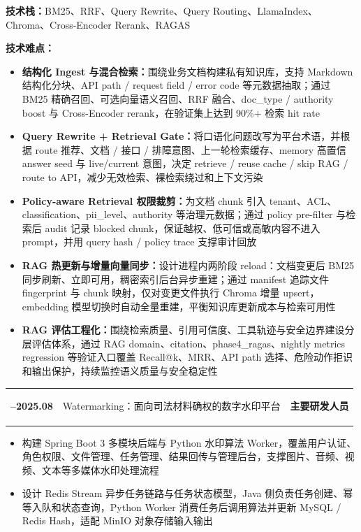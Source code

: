\documentclass[9pt,a4paper]{ctexart}
\makeatletter
\newcommand{\ResumeBodySize}{\fontsize{8.35pt}{9.20pt}\selectfont}
\newcommand{\ResumeSmallSize}{\fontsize{7.95pt}{8.75pt}\selectfont}
\newcommand{\ResumeEntrySize}{\fontsize{8.65pt}{9.35pt}\selectfont}
\newcommand{\LeftDateWidth}{3.30cm}
\newcommand{\RightMetaWidth}{4.05cm}
\newcommand{\resumeSubheading}[4]{%
  \vspace{-0.01em}%
  \begingroup
  \renewcommand{\tabularxcolumn}[1]{m{##1}}%
  \begin{tabularx}{\linewidth}{@{}>{\ResumeSmallSize\bfseries\color{metagray}\arraybackslash}m{\LeftDateWidth}>{\ResumeEntrySize\bfseries\raggedright\arraybackslash}X>{\ResumeSmallSize\bfseries\color{metagray}\raggedleft\arraybackslash}m{\RightMetaWidth}@{}}
    #1 & #2 & #3 \\
  \end{tabularx}%
  \endgroup
  \ifthenelse{\equal{#4}{}}{}{%
    \vspace{-0.14em}%
    {\ResumeSmallSize\color{metagray}\hspace{\LeftDateWidth}#4\par}%
  }%
  \vspace{-0.05em}%
}
\newenvironment{resumeItemList}{%
  \begin{itemize}[leftmargin=1.05em,itemsep=-0.06em,topsep=-0.02em,parsep=0pt,partopsep=0pt]
  \ResumeBodySize
}{%
  \end{itemize}\vspace{-0.10em}
}
\newcommand{\resumeItem}[1]{\item #1}
\newcommand{\resumePlainLine}[1]{{\ResumeBodySize #1\par}}
\makeatother
\begin{document}
\resumePlainLine{\textbf{技术栈：}BM25、RRF、Query Rewrite、Query Routing、LlamaIndex、Chroma、Cross-Encoder Rerank、RAGAS}

\resumePlainLine{\textbf{技术难点：}}
\begin{resumeItemList}
\resumeItem{\textbf{结构化 Ingest 与混合检索：}围绕业务文档构建私有知识库，支持 Markdown 结构化分块、API path / request field / error code 等元数据抽取；通过 BM25 精确召回、可选向量语义召回、RRF 融合、doc\_type / authority boost 与 Cross-Encoder rerank，在验证集上达到 90\%+ 检索 hit rate}

\resumeItem{\textbf{Query Rewrite + Retrieval Gate：}将口语化问题改写为平台术语，并根据 route 推荐、文档 / 接口 / 排障意图、上一轮检索缓存、memory 高置信 answer seed 与 live/current 意图，决定 retrieve / reuse cache / skip RAG / route to API，减少无效检索、裸检索绕过和上下文污染}

\resumeItem{\textbf{Policy-aware Retrieval 权限裁剪：}为文档 chunk 引入 tenant、ACL、classification、pii\_level、authority 等治理元数据；通过 policy pre-filter 与检索后 audit 记录 blocked chunk，保证越权、低可信或高敏内容不进入 prompt，并用 query hash / policy trace 支撑审计回放}

\resumeItem{\textbf{RAG 热更新与增量向量同步：}设计进程内两阶段 reload：文档变更后 BM25 同步刷新、立即可用，稠密索引后台异步重建；通过 manifest 追踪文件 fingerprint 与 chunk 映射，仅对变更文件执行 Chroma 增量 upsert，embedding 模型切换时自动全量重建，平衡知识库更新成本与检索可用性}

\resumeItem{\textbf{RAG 评估工程化：}围绕检索质量、引用可信度、工具轨迹与安全边界建设分层评估体系，通过 RAG domain、citation、phase4\_ragas、nightly metrics regression 等验证入口覆盖 Recall@k、MRR、API path 选择、危险动作拒识和输出保护，持续监控语义质量与安全稳定性}
\end{resumeItemList}

\resumeSubheading
{2025.04--2025.08}
{Watermarking：面向司法材料确权的数字水印平台}
{主要研发人员}
{中典司法所合作项目}

\begin{resumeItemList}
\resumeItem{构建 Spring Boot 3 多模块后端与 Python 水印算法 Worker，覆盖用户认证、角色权限、文件管理、任务管理、结果回传与管理后台，支撑图片、音频、视频、文本等多媒体水印处理流程}
\resumeItem{设计 Redis Stream 异步任务链路与任务状态模型，Java 侧负责任务创建、幂等入队和状态查询，Python Worker 消费任务后调用算法并更新 MySQL / Redis Hash，适配 MinIO 对象存储输入输出}
\end{resumeItemList}
\end{document}
